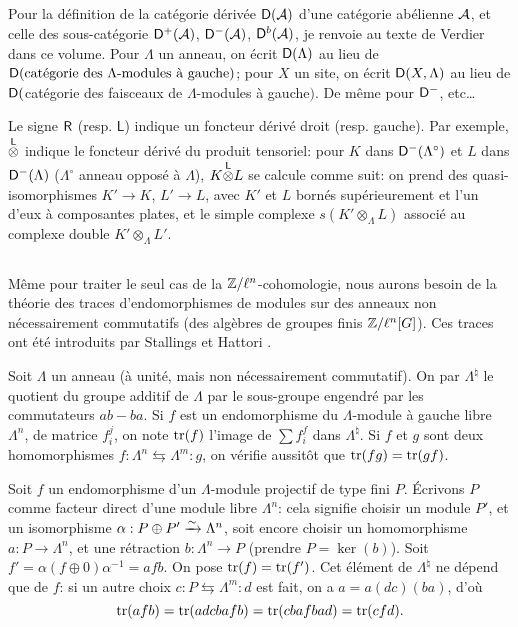 \documentclass[oneside]{book}
\begin{document}
\subsection{}\label{II:4-1}

Pour la définition de la catégorie dérivée $\mathsf{D}(\mathcal{A})$ d'une catégorie 
abélienne $\mathcal{A}$, et celle des sous-catégorie $\mathsf{D}^+(\mathcal{A})$, $\mathsf{D}^-(\mathcal{A})$, 
$\mathsf{D}^b(\mathcal{A})$, je renvoie au texte de Verdier dans ce volume. Pour $\Lambda$ 
un anneau, on écrit $\mathsf{D}(\Lambda)$ au lieu de 
$\mathsf{D}(\text{catégorie des $\Lambda$-modules à gauche})$; pour $X$ un site, on 
écrit $\mathsf{D}(X,\Lambda)$ au lieu de 
$\mathsf{D}($catégorie des faisceaux de $\Lambda$-modules à gauche$)$. De 
même pour $\mathsf{D}^-$, etc\ldots

Le signe $\mathsf{R}$ (resp. $\mathsf{L}$) indique un foncteur dérivé droit (resp. 
gauche). Par exemple, ${\overset{\mathsf{L}}{\otimes}}$ indique le foncteur dérivé du produit 
tensoriel: pour $K$ dans $\mathsf{D}^-(\Lambda^\circ)$ et $L$ dans $\mathsf{D}^-(\Lambda)$ 
($\Lambda^\circ$ anneau opposé à $\Lambda$), $K{\overset{\mathsf{L}}{\otimes}} L$ se calcule 
comme suit: on prend des quasi-isomorphismes $K'\to K$, $L'\to L$, avec 
$K'$ et $L$ bornés supérieurement et l'un d'eux à composantes plates, et 
le simple complexe $s(K'\otimes_\Lambda L)$ associé au complexe double 
$K'\otimes_\Lambda L'$. 





\subsection{}\label{II:4-2}

Même pour traiter le seul cas de la $\mathbb{Z}/\ell^n$-cohomologie, nous aurons 
besoin de la théorie des traces d'endomorphismes de modules sur des anneaux 
non nécessairement commutatifs (des algèbres de groupes finis 
$\mathbb{Z}/\ell^n[G]$). Ces traces ont été introduits par Stallings et Hattori 
\cite{II:B}. 

Soit $\Lambda$ un anneau (à unité, mais non nécessairement commutatif). 
On par $\Lambda^\natural$ le quotient du groupe additif de $\Lambda$ par le 
sous-groupe engendré par les commutateurs $a b - b a$. Si $f$ est un 
endomorphisme du $\Lambda$-module à gauche libre $\Lambda^n$, de matrice 
$f_i^j$, on note $\operatorname{tr}(f)$ l'image de $\sum f_i^f$ dans $\Lambda^\natural$. 
Si $f$ et $g$ sont deux homomorphismes 
$f:\Lambda^n \leftrightarrows \Lambda^m : g$, on vérifie aussitôt que 
$\operatorname{tr}(f g) = \operatorname{tr}(g f)$. 

Soit $f$ un endomorphisme d'un $\Lambda$-module projectif de type fini $P$. 
Écrivons $P$ comme facteur direct d'une module libre $\Lambda^n$: cela signifie 
choisir un module $P'$, et un isomorphisme $\alpha:P\oplus P'\xrightarrow\sim \Lambda^n$, 
soit encore choisir un homomorphisme $a:P\to \Lambda^n$, et une rétraction 
$b:\Lambda^n\to P$ (prendre $P=\ker(b)$). Soit 
$f'=\alpha(f\oplus 0)\alpha^{-1} =af b$. On pose $\operatorname{tr}(f) = \operatorname{tr}(f')$. Cet 
élément de $\Lambda^\natural$ ne dépend que de $f$: si un autre choix 
$c:P\leftrightarrows \Lambda^m:d$ est fait, on a $a=a(dc)(ba)$, d'où 
\[
 \operatorname{tr}(a f b) = \operatorname{tr}(adcbafb) = \operatorname{tr}(cbafbad) = \operatorname{tr}(cfd) \text{.}
\]
\end{document}
